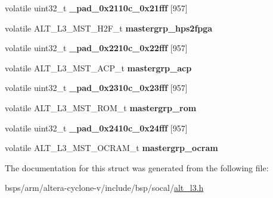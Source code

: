 \begin{DoxyCompactItemize}
\item 
\mbox{\label{structALT__L3__MSTGRP__s_a46ec359d9fde5faa9e44622e808a316f}} 
volatile uint32\+\_\+t {\bfseries \+\_\+pad\+\_\+0x2110c\+\_\+0x21fff} \mbox{[}957\mbox{]}
\item 
\mbox{\label{structALT__L3__MSTGRP__s_a52ba883ddf1d4252c096a5c84556c3d3}} 
volatile A\+L\+T\+\_\+\+L3\+\_\+\+M\+S\+T\+\_\+\+H2\+F\+\_\+t {\bfseries mastergrp\+\_\+hps2fpga}
\item 
\mbox{\label{structALT__L3__MSTGRP__s_a918c358db1cab82724d1d34901490842}} 
volatile uint32\+\_\+t {\bfseries \+\_\+pad\+\_\+0x2210c\+\_\+0x22fff} \mbox{[}957\mbox{]}
\item 
\mbox{\label{structALT__L3__MSTGRP__s_a66cb39fdc5fc3f98c0cdc2691c8681b9}} 
volatile A\+L\+T\+\_\+\+L3\+\_\+\+M\+S\+T\+\_\+\+A\+C\+P\+\_\+t {\bfseries mastergrp\+\_\+acp}
\item 
\mbox{\label{structALT__L3__MSTGRP__s_afad0cf0306a378c7f06bf416fcc0f2b4}} 
volatile uint32\+\_\+t {\bfseries \+\_\+pad\+\_\+0x2310c\+\_\+0x23fff} \mbox{[}957\mbox{]}
\item 
\mbox{\label{structALT__L3__MSTGRP__s_aa84e474898690b8e08bcc8d17aeffcfd}} 
volatile A\+L\+T\+\_\+\+L3\+\_\+\+M\+S\+T\+\_\+\+R\+O\+M\+\_\+t {\bfseries mastergrp\+\_\+rom}
\item 
\mbox{\label{structALT__L3__MSTGRP__s_a22efe73d413efbc9edb84455678dcaa4}} 
volatile uint32\+\_\+t {\bfseries \+\_\+pad\+\_\+0x2410c\+\_\+0x24fff} \mbox{[}957\mbox{]}
\item 
\mbox{\label{structALT__L3__MSTGRP__s_ab7ec5012232772ce65308d2bcb9841a6}} 
volatile A\+L\+T\+\_\+\+L3\+\_\+\+M\+S\+T\+\_\+\+O\+C\+R\+A\+M\+\_\+t {\bfseries mastergrp\+\_\+ocram}
\end{DoxyCompactItemize}


The documentation for this struct was generated from the following file\+:\begin{DoxyCompactItemize}
\item 
bsps/arm/altera-\/cyclone-\/v/include/bsp/socal/\mbox{\hyperlink{alt__l3_8h}{alt\+\_\+l3.\+h}}\end{DoxyCompactItemize}
